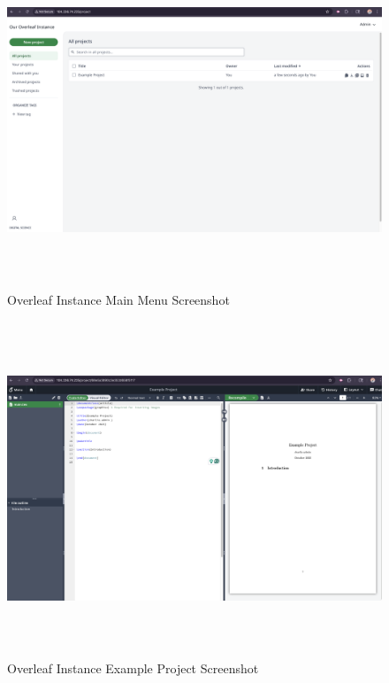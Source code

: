\begin{figure}[htp]
    \centering
    \includegraphics[width=15cm, height=10cm]{png/DigitalOcean/OverleafInstanceMainMenu.png}
    \caption{Overleaf Instance Main Menu Screenshot}
    \label{fig:OverleafInstanceMainMenu}
\end{figure}

\begin{figure}[htp]
    \centering
    \includegraphics[width=15cm, height=10cm]{png/DigitalOcean/OverleafInstanceExProject.png}
    \caption{Overleaf Instance Example Project Screenshot}
    \label{fig:OverleafInstanceExProject}
\end{figure}